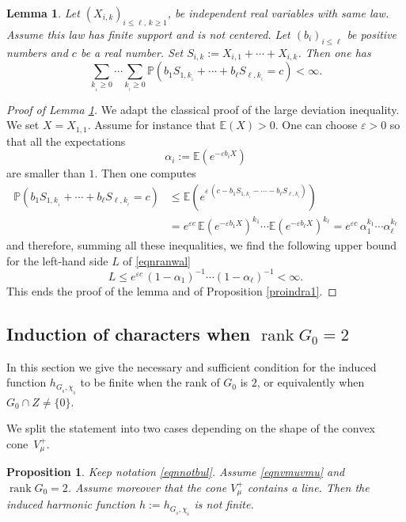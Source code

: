 \documentclass[JEP,XML,SOM,Unicode]{cedram}
\DeclareMathOperator{\rank}{rank}
\newtheorem{Prop}[Thm]{Proposition}
\newtheorem{Lem}[Thm]{Lemma}
\theoremstyle{definition}
\newcommand{\m}[1]{\mathbb{ #1}}
\let\al\alpha
\let\eps\varepsilon
\let\bq\relax
\let\eq\relax
\begin{document}
\begin{Lem}
\label{lemranwal}
Let $(X_{i,k})_{i\leq \ell,\, k\geq 1}$, be independent real variables
with same law. Assume this law has finite support and is not centered.
Let $(b_i)_{i\leq\ell}$ be positive numbers and $c$ be a real number.
Set $S_{i,k}:=X_{i,1}+\cdots+X_{i,k}$.
Then one has
\begin{equation}
\label{eqnranwal}
\sum_{k_{_1}\geq 0}\cdots\sum_{k_{_\ell}\geq 0}
\m P(b_1S_{1,k_{_1}}+\cdots +b_\ell S_{\ell,k_{_\ell}}=c)
<\infty.
\end{equation}
\end{Lem}

\begin{proof}[Proof of Lemma \ref{lemranwal}]
We adapt the classical proof of the large deviation inequality.
We set $X=X_{1,1}$. Assume for instance that $\m E (X)>0$.
One can choose $\eps>0$ so that all the expectations
\[
\al_i:=\m E(e^{-\eps b_i X})
\]
are smaller than $1$. Then one computes
\begin{align*}
\m P(b_1S_{1,k_{_1}}+\cdots +b_\ell S_{\ell,k_{_\ell}}=c)
&\leq
\m E(e^{\eps\,(c -b_1S_{1,k_{_1}}-\cdots -b_\ell S_{\ell,k_{_\ell}})})\\
&=
e^{\eps c}\,\m E(e^{-\eps b_1X})^{k_1}\cdots \m E(e^{-\eps b_\ell X})^{k_\ell}=
e^{\eps c}\,\al_1^{k_1}\cdots \al_\ell^{k_\ell}
\end{align*}
and therefore, summing all these inequalities, we find the following upper bound
for the left-hand side $L$ of \eqref{eqnranwal}
\[
L\leq e^{\eps c}\,(1-\al_1)^{-1}\cdots (1-\al_\ell)^{-1} <\infty.
\]
This ends the proof of the lemma and of Proposition \ref{proindra1}.
\end{proof}

\subsection{Induction of characters when $\rank G_0=2$}
\label{secindhar2}
\bq
In this section we give the necessary and sufficient condition for
the induced function $h_{G_{_0},\chi_{_0}}$ to be finite when
the rank of $G_0$ is $2$,
or equivalently when $G_0\cap Z\neq\{0\}$.
\eq

We split the statement into two cases depending
on the shape of the convex cone~$V^+_\mu$.

\begin{Prop}
\label{proindra2}
Keep notation \eqref{eqnnotbul}. Assume \eqref{eqnvmuvmu} and $\rank G_0=2$.
Assume moreover that the cone $V^+_\mu$ contains a line. Then
the induced harmonic function $h:=h_{G_{_0},\chi_{_0}}$ is not finite.
\end{Prop}
\end{document}

